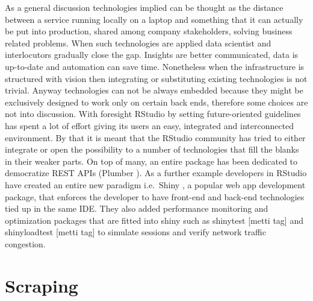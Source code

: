 \documentclass[
  12pt,
  a4paper,
  oneside]{book}
\begin{document}
As a general discussion technologies implied can be thought as the distance between a service running locally on a laptop and something that it can actually be put into production, shared among company stakeholders, solving business related problems. When such technologies are applied data scientist and interlocutors gradually close the gap. Insights are better communicated, data is up-to-date and automation can save time. Nonetheless when the infrastructure is structured with vision then integrating or substituting existing technologies is not trivial. Anyway technologies can not be always embedded because they might be exclusively designed to work only on certain back ends, therefore some choices are not into discussion. With foresight RStudio by setting future-oriented guidelines has spent a lot of effort giving its users an easy, integrated and interconnected environment. By that it is meant that the RStudio community has tried to either integrate or open the possibility to a number of technologies that fill the blanks in their weaker parts. On top of many, an entire package has been dedicated to democratize REST APIs (Plumber \citep{plumber}). As a further example developers in RStudio have created an entire new paradigm i.e.~Shiny \citep{shiny}, a popular web app development package, that enforces the developer to have front-end and back-end technologies tied up in the same IDE. They also added performance monitoring and optimization packages that are fitted into shiny such as shinytest {[}metti tag{]} and shinyloadtest {[}metti tag{]} to simulate sessions and verify network traffic congestion.

\hypertarget{scraping}{%
\chapter{Scraping}\label{scraping}}
\end{document}
